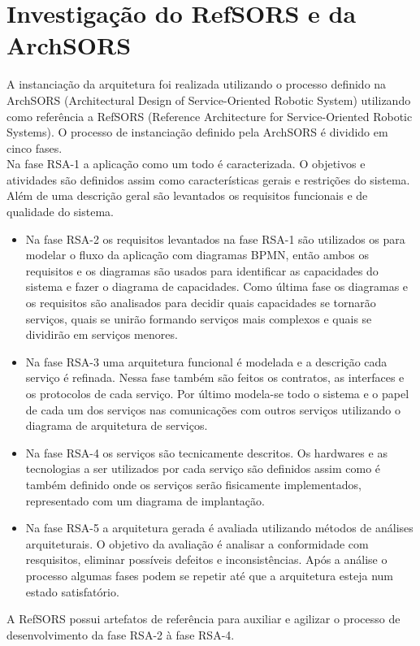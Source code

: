 \documentclass[12pt]{report}
\begin{document}
\section{Investigação do RefSORS e da ArchSORS}
A instanciação da arquitetura foi realizada utilizando o processo definido na ArchSORS (Architectural Design of Service-Oriented Robotic System) utilizando como referência a RefSORS (Reference Architecture for Service-Oriented Robotic Systems). O processo de instanciação definido pela ArchSORS é dividido em cinco fases.\\
Na fase RSA-1 a aplicação como um todo é caracterizada. O objetivos e atividades são definidos assim como características gerais e restrições do sistema. Além de uma descrição geral são levantados os requisitos funcionais e de qualidade do sistema.
\begin{itemize}
\item Na fase RSA-2 os requisitos levantados na fase RSA-1 são utilizados os para modelar o fluxo da aplicação com diagramas BPMN, então ambos os requisitos e os diagramas são usados para identificar as capacidades do sistema e fazer o diagrama de capacidades. Como última fase os diagramas e os requisitos são analisados para decidir quais capacidades se tornarão serviços, quais se unirão formando serviços mais complexos e quais se dividirão em serviços menores.
\item Na fase RSA-3 uma arquitetura funcional é modelada e a descrição cada serviço é refinada. Nessa fase também são feitos os contratos, as interfaces e os protocolos de cada serviço. Por último modela-se todo o sistema e o papel de cada um dos serviços nas comunicações com outros serviços utilizando o diagrama de arquitetura de serviços.
\item Na fase RSA-4 os serviços são tecnicamente descritos. Os hardwares e as tecnologias a ser utilizados por cada serviço são definidos assim como é também definido onde os serviços serão fisicamente implementados, representado com um diagrama de implantação.
\item Na fase RSA-5 a arquitetura gerada é avaliada utilizando métodos de análises arquiteturais. O objetivo da avaliação é analisar a conformidade com resquisitos, eliminar possíveis defeitos e inconsistências. Após a análise o processo algumas fases podem se repetir até que a arquitetura esteja num estado satisfatório.
\end{itemize}
A RefSORS possui artefatos de referência para auxiliar e agilizar o processo de desenvolvimento da fase RSA-2 à fase RSA-4.\\
\end{document}
